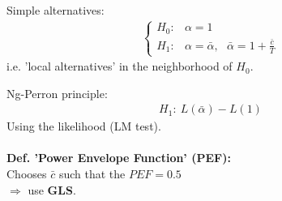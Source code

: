 \begin{multicols}{2}
\begin{align*}
  \end{align*}
Simple alternatives:
\begin{align*}
  \left\{ \begin{array}{cc}
    H_0: & \alpha=1           \\
    H_1: & \alpha=\bar{\alpha},\ \ \ \bar{\alpha}=1+\frac{\bar{c}}{T}
\end{array} \right.
\end{align*}
i.e. 'local alternatives' in the neighborhood of $H_0$.\par
Ng-Perron principle:
\begin{align}
  H_1:\ L(\bar{\alpha})-L(1)
\end{align}
Using the likelihood (LM test).
\\ \\
\textbf{Def. 'Power Envelope Function' (PEF):}\\
Chooses $\bar{c}$ such that the $PEF=0.5$\\
$\Rightarrow$ use \textbf{GLS}.
\end{multicols}



